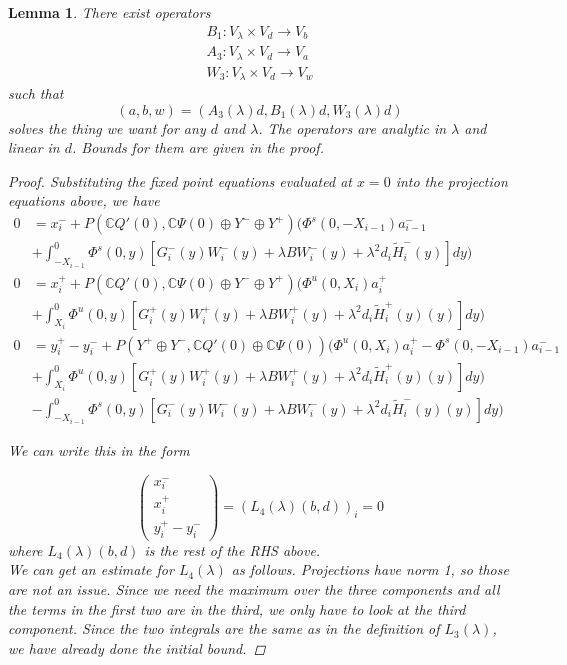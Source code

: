 \documentclass[12pt]{article}
\def\C{{\mathbb C}}
\newtheorem{lemma}{Lemma}
\begin{document}
\begin{lemma}
There exist operators 
\begin{align*}
B_1: V_\lambda \times V_d \rightarrow V_b \\
A_3: V_\lambda \times V_d \rightarrow V_a \\
W_3: V_\lambda \times V_d \rightarrow V_w
\end{align*}
such that 
\[
(a,b,w) = (A_3(\lambda)d, B_1(\lambda)d, W_3(\lambda)d)
\]
solves the thing we want for any $d$ and $\lambda$. The operators are analytic in $\lambda$ and linear in $d$. Bounds for them are given in the proof.

\begin{proof}
Substituting the fixed point equations evaluated at $x = 0$ into the projection equations above, we have 
\begin{align*}
0 &= x_i^- + P(\C Q'(0), \C\Psi(0) \oplus Y^- \oplus Y^+) \Big( \Phi^s(0, -X_{i-1})a^-_{i-1}  \\
&+ \int_{-X_{i-1}}^0 \Phi^s(0, y)[G_i^-(y) W_i^-(y) + \lambda B W_i^-(y) + \lambda^2 d_i \tilde{H}_i^-(y) ] dy \Big) \\
0 &= x_i^+ + P(\C Q'(0), \C\Psi(0) \oplus Y^- \oplus Y^+) \Big( \Phi^u(0, X_i)a^+_{i} \\
&+ \int_{X_{i}}^0 \Phi^u(0, y)[G_i^+(y) W_i^+(y) + \lambda B W_i^+(y) + \lambda^2 d_i \tilde{H}_i^+(y)(y) ] dy \Big)\\
0 &= y_i^+ - y_i^- + P(Y^+ \oplus Y^-, \C Q'(0) \oplus \C\Psi(0) )\Big( \Phi^u(0, X_i)a^+_{i} - \Phi^s(0, -X_{i-1})a^-_{i-1} \\
&+ \int_{X_{i}}^0 \Phi^u(0, y)[G_i^+(y) W_i^+(y) + \lambda B W_i^+(y) + \lambda^2 d_i \tilde{H}_i^+(y)(y) ] dy \Big)\\
&- \int_{-X_{i-1}}^0 \Phi^s(0, y)[G_i^-(y) W_i^-(y) + \lambda B W_i^-(y) + \lambda^2 d_i \tilde{H}_i^-(y)(y) ] dy \Big)
\end{align*}

We can write this in the form

\[ 
\begin{pmatrix}x_i^- \\ x_i^+ \\ y_i^+ - y_i^- \end{pmatrix} = (L_4(\lambda)(b,d))_i = 0
\]
where $L_4(\lambda)(b,d)$ is the rest of the RHS above.\\

We can get an estimate for $L_4(\lambda)$ as follows. Projections have norm 1, so those are not an issue. Since we need the maximum over the three components and all the terms in the first two are in the third, we only have to look at the third component. Since the two integrals are the same as in the definition of $L_3(\lambda)$, we have already done the initial bound.


\end{proof}
\end{lemma}
\end{document}
